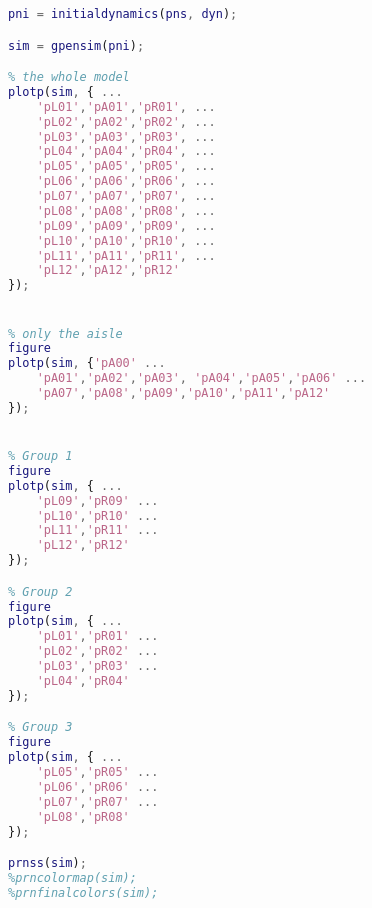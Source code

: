 \begin{lstlisting}[language=MATLAB, caption=block.m]
pni = initialdynamics(pns, dyn);

sim = gpensim(pni);

% the whole model
plotp(sim, { ...
    'pL01','pA01','pR01', ...
    'pL02','pA02','pR02', ...
    'pL03','pA03','pR03', ...
    'pL04','pA04','pR04', ...
    'pL05','pA05','pR05', ...
    'pL06','pA06','pR06', ...
    'pL07','pA07','pR07', ...
    'pL08','pA08','pR08', ...
    'pL09','pA09','pR09', ...
    'pL10','pA10','pR10', ...
    'pL11','pA11','pR11', ...
    'pL12','pA12','pR12'
});


% only the aisle
figure
plotp(sim, {'pA00' ...
    'pA01','pA02','pA03', 'pA04','pA05','pA06' ...
    'pA07','pA08','pA09','pA10','pA11','pA12'
});


% Group 1
figure
plotp(sim, { ...
    'pL09','pR09' ...
    'pL10','pR10' ...
    'pL11','pR11' ...
    'pL12','pR12'
});

% Group 2
figure
plotp(sim, { ...
    'pL01','pR01' ...
    'pL02','pR02' ...
    'pL03','pR03' ...
    'pL04','pR04'
});

% Group 3
figure
plotp(sim, { ...
    'pL05','pR05' ...
    'pL06','pR06' ...
    'pL07','pR07' ...
    'pL08','pR08'
});

prnss(sim);
%prncolormap(sim);
%prnfinalcolors(sim);
\end{lstlisting}



